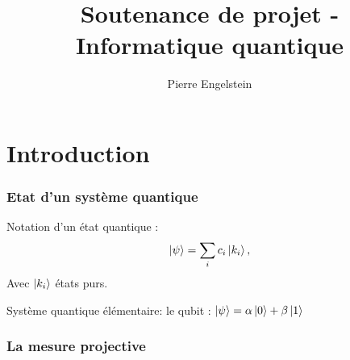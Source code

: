 \documentclass{beamer}
\title{Soutenance de projet - Informatique quantique}
\author{Pierre Engelstein}
\institute{Polytech Angers}
\begin{document}

\frame{\titlepage}








% 


\section{Introduction}

\begin{frame}
\frametitle{Etat d'un système quantique}

\begin{definition}
  Notation d'un état quantique :
\begin{equation}
    \ket{\psi} = \displaystyle\sum_{i} c_i \ket{k_i},
\end{equation}
Avec $\ket{k_i}$ états purs.
\end{definition}

Système quantique élémentaire: le qubit : $\ket{\psi} = \alpha \ket{0} + \beta \ket{1}$

\end{frame}

\begin{frame}
\frametitle{La mesure projective}
\end{frame}
\end{document}
